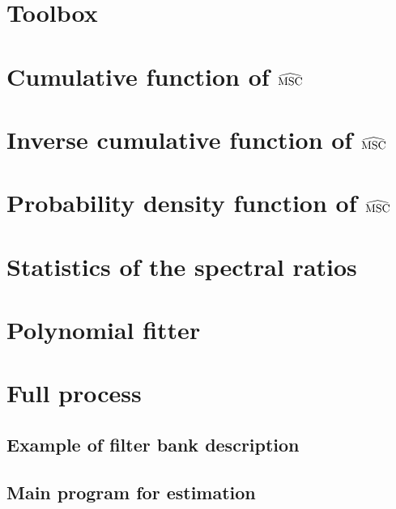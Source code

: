 \section{Toolbox}
\label{s:fbankanalysis}
{\tiny }

\section{Cumulative function of $\widehat{\mathrm{MSC}}$}
{\tiny 

\section{Inverse cumulative function of $\widehat{\mathrm{MSC}}$}
{\tiny 

\section{Probability density function of $\widehat{\mathrm{MSC}}$}
{\tiny 

 \section{Statistics of the spectral ratios}
{\tiny 

 \section{Polynomial fitter}
{\tiny 

 \section{Full process}

 \subsection{Example of filter bank description}
{\tiny }

 \clearpage
\subsection{Main program for estimation}
{\tiny }


}}}}}
